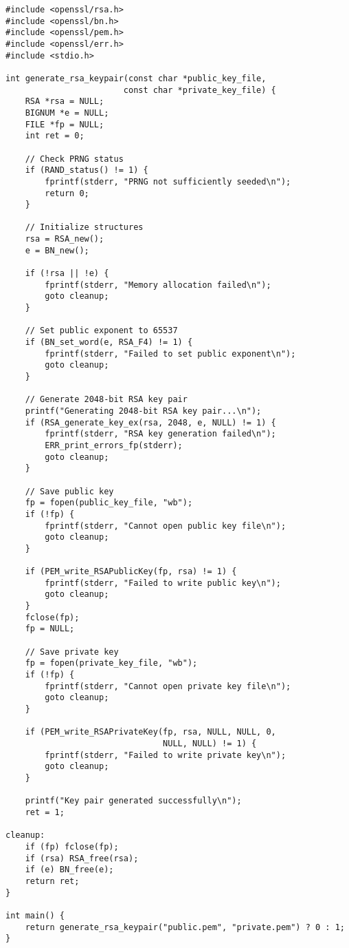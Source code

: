 \begin{verbatim}
#include <openssl/rsa.h>
#include <openssl/bn.h>
#include <openssl/pem.h>
#include <openssl/err.h>
#include <stdio.h>

int generate_rsa_keypair(const char *public_key_file, 
                        const char *private_key_file) {
    RSA *rsa = NULL;
    BIGNUM *e = NULL;
    FILE *fp = NULL;
    int ret = 0;
    
    // Check PRNG status
    if (RAND_status() != 1) {
        fprintf(stderr, "PRNG not sufficiently seeded\n");
        return 0;
    }
    
    // Initialize structures
    rsa = RSA_new();
    e = BN_new();
    
    if (!rsa || !e) {
        fprintf(stderr, "Memory allocation failed\n");
        goto cleanup;
    }
    
    // Set public exponent to 65537
    if (BN_set_word(e, RSA_F4) != 1) {
        fprintf(stderr, "Failed to set public exponent\n");
        goto cleanup;
    }
    
    // Generate 2048-bit RSA key pair
    printf("Generating 2048-bit RSA key pair...\n");
    if (RSA_generate_key_ex(rsa, 2048, e, NULL) != 1) {
        fprintf(stderr, "RSA key generation failed\n");
        ERR_print_errors_fp(stderr);
        goto cleanup;
    }
    
    // Save public key
    fp = fopen(public_key_file, "wb");
    if (!fp) {
        fprintf(stderr, "Cannot open public key file\n");
        goto cleanup;
    }
    
    if (PEM_write_RSAPublicKey(fp, rsa) != 1) {
        fprintf(stderr, "Failed to write public key\n");
        goto cleanup;
    }
    fclose(fp);
    fp = NULL;
    
    // Save private key
    fp = fopen(private_key_file, "wb");
    if (!fp) {
        fprintf(stderr, "Cannot open private key file\n");
        goto cleanup;
    }
    
    if (PEM_write_RSAPrivateKey(fp, rsa, NULL, NULL, 0, 
                                NULL, NULL) != 1) {
        fprintf(stderr, "Failed to write private key\n");
        goto cleanup;
    }
    
    printf("Key pair generated successfully\n");
    ret = 1;
    
cleanup:
    if (fp) fclose(fp);
    if (rsa) RSA_free(rsa);
    if (e) BN_free(e);
    return ret;
}

int main() {
    return generate_rsa_keypair("public.pem", "private.pem") ? 0 : 1;
}
\end{verbatim}

